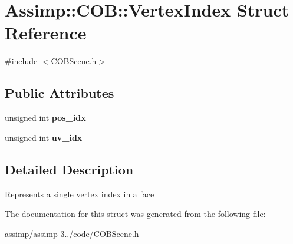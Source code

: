 \hypertarget{struct_assimp_1_1_c_o_b_1_1_vertex_index}{\section{Assimp\+:\+:C\+O\+B\+:\+:Vertex\+Index Struct Reference}
\label{struct_assimp_1_1_c_o_b_1_1_vertex_index}
}


{\ttfamily \#include $<$C\+O\+B\+Scene.\+h$>$}

\subsection*{Public Attributes}
\begin{DoxyCompactItemize}
\item 
\hypertarget{struct_assimp_1_1_c_o_b_1_1_vertex_index_a6daccab6caef1a315c741d72d7d253ee}{unsigned int {\bfseries pos\+\_\+idx}}\label{struct_assimp_1_1_c_o_b_1_1_vertex_index_a6daccab6caef1a315c741d72d7d253ee}

\item 
\hypertarget{struct_assimp_1_1_c_o_b_1_1_vertex_index_a4ae553ca4ea472791d189793ee19852d}{unsigned int {\bfseries uv\+\_\+idx}}\label{struct_assimp_1_1_c_o_b_1_1_vertex_index_a4ae553ca4ea472791d189793ee19852d}

\end{DoxyCompactItemize}


\subsection{Detailed Description}
Represents a single vertex index in a face 

The documentation for this struct was generated from the following file\+:\begin{DoxyCompactItemize}
\item 
assimp/assimp-\/3../code/\hyperlink{_c_o_b_scene_8h}{C\+O\+B\+Scene.\+h}\end{DoxyCompactItemize}
